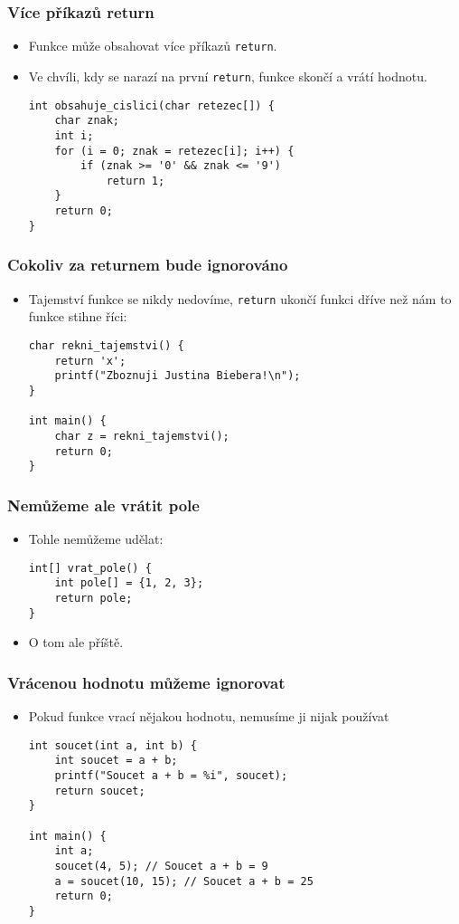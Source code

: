 \documentclass{beamer}
\newenvironment{itemizex}%
  {\large \begin{itemize}%
    \setlength{\itemsep}{8pt}%
    \setlength{\parskip}{8pt}}%
  {\end{itemize}}
\begin{document}
\begin{frame}[t,fragile]\frametitle{Více příkazů return} 
    \begin{itemizex}
        \item Funkce může obsahovat více příkazů \texttt{return}.
        \item Ve chvíli, kdy se narazí na první \texttt{return}, funkce skončí a vrátí hodnotu.
        \begin{verbatim} 
int obsahuje_cislici(char retezec[]) {
    char znak;
    int i;
    for (i = 0; znak = retezec[i]; i++) {
        if (znak >= '0' && znak <= '9') 
            return 1;
    }
    return 0;
}
        \end{verbatim}
    \end{itemizex}
\end{frame}


\begin{frame}[t,fragile]\frametitle{Cokoliv za returnem bude ignorováno} 
    \begin{itemizex}
        \item Tajemství funkce se nikdy nedovíme, \texttt{return} ukončí funkci dříve než nám to funkce stihne říci:
        \begin{verbatim} 
char rekni_tajemstvi() {
    return 'x';
    printf("Zboznuji Justina Biebera!\n");
}

int main() {
    char z = rekni_tajemstvi();
    return 0;
}
        \end{verbatim}
    \end{itemizex}
\end{frame}


\begin{frame}[t,fragile]\frametitle{Nemůžeme ale vrátit pole} 
    \begin{itemizex}
        \item Tohle nemůžeme udělat:
        \begin{verbatim} 
int[] vrat_pole() {
    int pole[] = {1, 2, 3};
    return pole;
}
        \end{verbatim}
        \item  O tom ale příště.
    \end{itemizex}
\end{frame}


\begin{frame}[t,fragile]\frametitle{Vrácenou hodnotu můžeme ignorovat} 
    \begin{itemize}
        \item Pokud funkce vrací nějakou hodnotu, nemusíme ji nijak používat
        \begin{verbatim} 
int soucet(int a, int b) {
    int soucet = a + b;
    printf("Soucet a + b = %i", soucet);
    return soucet;
}

int main() {
    int a;
    soucet(4, 5); // Soucet a + b = 9
    a = soucet(10, 15); // Soucet a + b = 25
    return 0;
}
        \end{verbatim}
    \end{itemize}
\end{frame}
\end{document}
